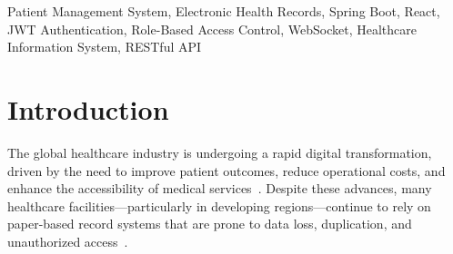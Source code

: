 \documentclass[conference]{IEEEtran}
\begin{document}
\begin{abstract}
Healthcare facilities worldwide continue to face significant challenges arising from paper-based record-keeping, fragmented patient information, appointment scheduling conflicts, and limited accessibility to medical histories. These persistent issues lead to treatment delays, data loss, and a deteriorated patient experience. This paper presents the design and implementation of a \textbf{Patient Management System (PMS)}---a comprehensive, web-based application engineered to centralize and streamline the management of patient records, medical histories, appointments, billing, pharmacy operations, and clinical workflows. The system employs a modern three-tier architecture utilizing \textbf{React} for the frontend, \textbf{Spring Boot (Java)} for the backend, and \textbf{PostgreSQL} as the relational database. Security is enforced through \textbf{JSON Web Token (JWT)} authentication, \textbf{BCrypt} password hashing, role-based access control (RBAC) spanning ten distinct user roles, and comprehensive audit logging. Real-time notifications are delivered via \textbf{WebSocket} integration. The system has been deployed with the frontend hosted on \textbf{Vercel} and the backend on \textbf{Render}, demonstrating a scalable, cloud-native deployment strategy. Evaluation results indicate that the PMS significantly improves data accuracy, reduces manual workload, and supports enhanced clinical decision-making.
\end{abstract}

\begin{IEEEkeywords}
Patient Management System, Electronic Health Records, Spring Boot, React, JWT Authentication, Role-Based Access Control, WebSocket, Healthcare Information System, RESTful API
\end{IEEEkeywords}

\section{Introduction}

The global healthcare industry is undergoing a rapid digital transformation, driven by the need to improve patient outcomes, reduce operational costs, and enhance the accessibility of medical services~\cite{b1}. Despite these advances, many healthcare facilities---particularly in developing regions---continue to rely on paper-based record systems that are prone to data loss, duplication, and unauthorized access~\cite{b2}.
\end{document}

